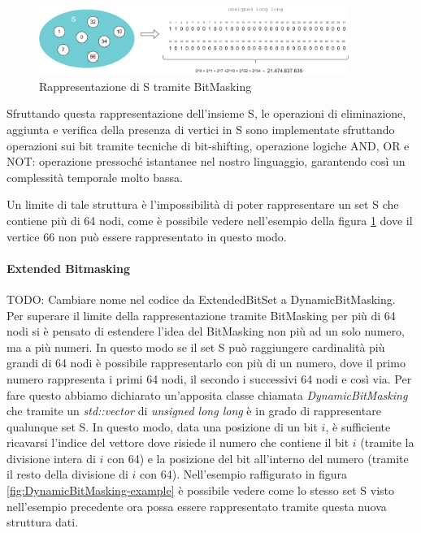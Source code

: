 \begin{figure}[h]
	\centering
	\includegraphics[width=0.9\textwidth]{./images/BitMasking Example.png}
	\caption{Rappresentazione di S tramite BitMasking}
	\label{fig:bitmasking-example}
\end{figure}

Sfruttando questa rappresentazione dell'insieme S, le operazioni di eliminazione, aggiunta e verifica della presenza di vertici in S sono implementate sfruttando operazioni sui bit tramite tecniche di bit-shifting, operazione logiche AND, OR e NOT: operazione pressoché istantanee nel nostro linguaggio, garantendo così un complessità temporale molto bassa.

Un limite di tale struttura è l'impossibilità di poter rappresentare un set S che contiene più di 64 nodi, come è possibile vedere nell'esempio della figura \ref{fig:bitmasking-example} dove il vertice 66 non può essere rappresentato in questo modo.

\paragraph{Extended Bitmasking}
TODO: Cambiare nome nel codice da ExtendedBitSet a DynamicBitMasking.
Per superare il limite della rappresentazione tramite BitMasking per più di 64 nodi si è pensato di estendere l'idea del BitMasking non più ad un solo numero, ma a più numeri. In questo modo se il set S può raggiungere cardinalità più grandi di 64 nodi è possibile rappresentarlo con più di un numero, dove il primo numero rappresenta i primi 64 nodi, il secondo i successivi 64 nodi e così via. Per fare questo abbiamo dichiarato un'apposita classe chiamata \textit{DynamicBitMasking} che tramite un \textit{std::vector} di \textit{unsigned long long} è in grado di rappresentare qualunque set S. In questo modo, data una posizione di un bit $i$, è sufficiente ricavarsi l'indice del vettore dove risiede il numero che contiene il bit $i$ (tramite la divisione intera di $i$ con 64) e la posizione del bit all'interno del numero (tramite il resto della divisione di $i$ con 64). Nell'esempio raffigurato in figura \ref{fig:DynamicBitMasking-example} è possibile vedere come lo stesso set S visto nell'esempio precedente ora possa essere rappresentato tramite questa nuova struttura dati.

